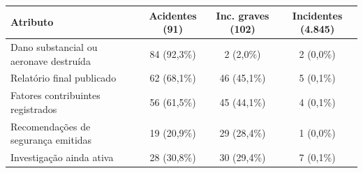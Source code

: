 \begin{tabular}{lccc}
\toprule
\textbf{Atributo} & \textbf{Acidentes (91)} & \textbf{Inc. graves (102)} & \textbf{Incidentes (4.845)} \\
\midrule
Dano substancial ou aeronave destruída & 84 (92,3\%) & 2 (2,0\%) & 2 (0,0\%) \\
Relatório final publicado & 62 (68,1\%) & 46 (45,1\%) & 5 (0,1\%) \\
Fatores contribuintes registrados & 56 (61,5\%) & 45 (44,1\%) & 4 (0,1\%) \\
Recomendações de segurança emitidas & 19 (20,9\%) & 29 (28,4\%) & 1 (0,0\%) \\
Investigação ainda ativa & 28 (30,8\%) & 30 (29,4\%) & 7 (0,1\%) \\
\bottomrule
\end{tabular}
